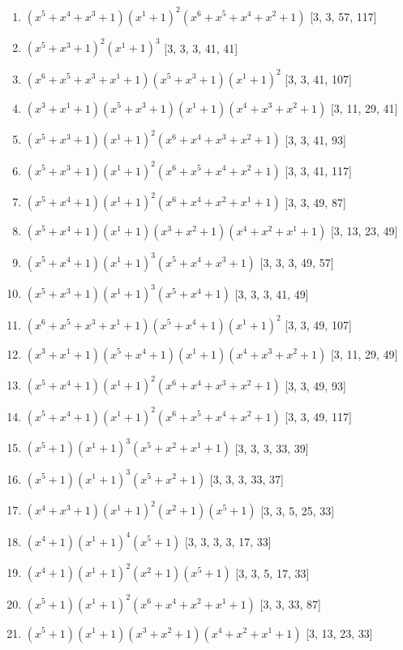 \documentclass[10pt,twocolumn]{article}
\begin{document}
\begin{enumerate}
\item $(x^{5} + x^{4} + x^{3} + 1)(x^{1} + 1)^{2}(x^{6} + x^{5} + x^{4} + x^{2} + 1)$  [3, 3, 57, 117]
\item $(x^{5} + x^{3} + 1)^{2}(x^{1} + 1)^{3}$  [3, 3, 3, 41, 41]
\item $(x^{6} + x^{5} + x^{3} + x^{1} + 1)(x^{5} + x^{3} + 1)(x^{1} + 1)^{2}$  [3, 3, 41, 107]
\item $(x^{3} + x^{1} + 1)(x^{5} + x^{3} + 1)(x^{1} + 1)(x^{4} + x^{3} + x^{2} + 1)$  [3, 11, 29, 41]
\item $(x^{5} + x^{3} + 1)(x^{1} + 1)^{2}(x^{6} + x^{4} + x^{3} + x^{2} + 1)$  [3, 3, 41, 93]
\item $(x^{5} + x^{3} + 1)(x^{1} + 1)^{2}(x^{6} + x^{5} + x^{4} + x^{2} + 1)$  [3, 3, 41, 117]
\item $(x^{5} + x^{4} + 1)(x^{1} + 1)^{2}(x^{6} + x^{4} + x^{2} + x^{1} + 1)$  [3, 3, 49, 87]
\item $(x^{5} + x^{4} + 1)(x^{1} + 1)(x^{3} + x^{2} + 1)(x^{4} + x^{2} + x^{1} + 1)$  [3, 13, 23, 49]
\item $(x^{5} + x^{4} + 1)(x^{1} + 1)^{3}(x^{5} + x^{4} + x^{3} + 1)$  [3, 3, 3, 49, 57]
\item $(x^{5} + x^{3} + 1)(x^{1} + 1)^{3}(x^{5} + x^{4} + 1)$  [3, 3, 3, 41, 49]
\item $(x^{6} + x^{5} + x^{3} + x^{1} + 1)(x^{5} + x^{4} + 1)(x^{1} + 1)^{2}$  [3, 3, 49, 107]
\item $(x^{3} + x^{1} + 1)(x^{5} + x^{4} + 1)(x^{1} + 1)(x^{4} + x^{3} + x^{2} + 1)$  [3, 11, 29, 49]
\item $(x^{5} + x^{4} + 1)(x^{1} + 1)^{2}(x^{6} + x^{4} + x^{3} + x^{2} + 1)$  [3, 3, 49, 93]
\item $(x^{5} + x^{4} + 1)(x^{1} + 1)^{2}(x^{6} + x^{5} + x^{4} + x^{2} + 1)$  [3, 3, 49, 117]
\item $(x^{5} + 1)(x^{1} + 1)^{3}(x^{5} + x^{2} + x^{1} + 1)$  [3, 3, 3, 33, 39]
\item $(x^{5} + 1)(x^{1} + 1)^{3}(x^{5} + x^{2} + 1)$  [3, 3, 3, 33, 37]
\item $(x^{4} + x^{3} + 1)(x^{1} + 1)^{2}(x^{2} + 1)(x^{5} + 1)$  [3, 3, 5, 25, 33]
\item $(x^{4} + 1)(x^{1} + 1)^{4}(x^{5} + 1)$  [3, 3, 3, 3, 17, 33]
\item $(x^{4} + 1)(x^{1} + 1)^{2}(x^{2} + 1)(x^{5} + 1)$  [3, 3, 5, 17, 33]
\item $(x^{5} + 1)(x^{1} + 1)^{2}(x^{6} + x^{4} + x^{2} + x^{1} + 1)$  [3, 3, 33, 87]
\item $(x^{5} + 1)(x^{1} + 1)(x^{3} + x^{2} + 1)(x^{4} + x^{2} + x^{1} + 1)$  [3, 13, 23, 33]

\end{enumerate}
\end{document}

